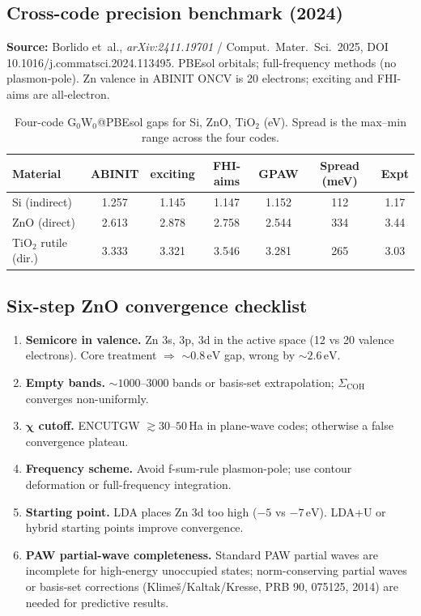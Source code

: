 \documentclass[11pt]{article}
\newcommand{\eV}{\ensuremath{\,\mathrm{eV}}}
\begin{document}
\subsection{Cross-code precision benchmark (2024)}

\textbf{Source:} Borlido et~al., \emph{arXiv:2411.19701} /
Comput.~Mater.~Sci.\ 2025, DOI 10.1016/j.commatsci.2024.113495.
PBEsol orbitals; full-frequency methods (no plasmon-pole). Zn valence in
ABINIT ONCV is 20 electrons; exciting and FHI-aims are all-electron.

\begin{table}[h]
\centering
\caption{Four-code G$_0$W$_0$@PBEsol gaps for Si, ZnO, TiO$_2$
(eV). Spread is the max--min range across the four codes.}
\label{tab:multicode_2024}
\small
\begin{tabular}{l c c c c c c}
\toprule
Material & ABINIT & exciting & FHI-aims & GPAW & Spread (meV) & Expt \\
\midrule
Si (indirect)        & 1.257 & 1.145 & 1.147 & 1.152 & 112 & 1.17 \\
ZnO (direct)         & 2.613 & 2.878 & 2.758 & 2.544 & 334 & 3.44 \\
TiO$_2$ rutile (dir.) & 3.333 & 3.321 & 3.546 & 3.281 & 265 & 3.03 \\
\bottomrule
\end{tabular}
\end{table}

\subsection{Six-step ZnO convergence checklist}

\begin{enumerate}
  \item \textbf{Semicore in valence.} Zn 3s, 3p, 3d in the active space
        (12 vs 20 valence electrons). Core treatment $\Rightarrow$
        $\sim 0.8\eV$ gap, wrong by $\sim 2.6\eV$.
  \item \textbf{Empty bands.} $\sim 1000$--$3000$ bands or basis-set
        extrapolation; $\Sigma_{\mathrm{COH}}$ converges non-uniformly.
  \item \textbf{$\boldsymbol{\chi}$ cutoff.} ENCUTGW $\gtrsim 30$--$50$\,Ha
        in plane-wave codes; otherwise a false convergence plateau.
  \item \textbf{Frequency scheme.} Avoid f-sum-rule plasmon-pole;
        use contour deformation or full-frequency integration.
  \item \textbf{Starting point.} LDA places Zn 3d too high
        ($-5$ vs $-7\eV$). LDA+U or hybrid starting points improve
        convergence.
  \item \textbf{PAW partial-wave completeness.} Standard PAW partial waves
        are incomplete for high-energy unoccupied states; norm-conserving
        partial waves or basis-set corrections (Klime\v{s}/Kaltak/Kresse,
        PRB 90, 075125, 2014) are needed for predictive results.
\end{enumerate}
\end{document}
